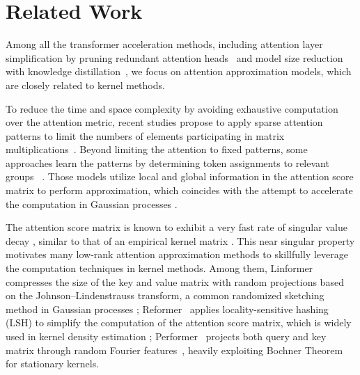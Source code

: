 \section{Related Work}
\label{sec:related_work}



Among all the transformer acceleration methods, including attention layer simplification by pruning redundant attention heads~\citep{DBLP:conf/acl/VoitaTMST19, DBLP:conf/nips/MichelLN19} and
model size reduction with knowledge distillation~\citep{DBLP:conf/emnlp/JiaoYSJCL0L20, DBLP:journals/corr/abs-1903-12136, DBLP:conf/acl/LiuZWZDJ20}, 
we focus on attention approximation models, which are closely related to kernel methods. 


To reduce the time and space complexity by avoiding exhaustive computation over the attention metric, recent studies propose to apply sparse attention patterns to limit the numbers of elements participating in matrix multiplications~\citep{DBLP:conf/emnlp/QiuMLYW020, DBLP:journals/corr/abs-1904-10509, DBLP:conf/nips/ZaheerGDAAOPRWY20, DBLP:journals/corr/abs-2004-05150}. 
Beyond limiting the attention to fixed patterns, some approaches learn the patterns by determining
token assignments to relevant groups ~\citep{DBLP:conf/iclr/KitaevKL20, DBLP:journals/tacl/RoySVG21}. 
Those models utilize local and global information in the attention score matrix to perform approximation,
which coincides with the attempt to accelerate the computation in Gaussian processes \citep{snelson2007local}.


The attention score matrix is known to exhibit a very fast rate of singular value decay \citep{bhojanapalli2020low, dong2021attention}, similar to that of an empirical kernel matrix \citep{yang2017randomized}.
This near singular property motivates many low-rank attention approximation methods to skillfully leverage the computation techniques in kernel methods.
Among them, Linformer~\citep{DBLP:journals/corr/abs-2006-04768} compresses the size of the key and value matrix with random projections based on the Johnson–Lindenstrauss transform, a common randomized sketching method in Gaussian processes \citep{yang2017randomized};
Reformer~\citep{DBLP:conf/iclr/KitaevKL20} applies locality-sensitive hashing (LSH) \citep{har2012approximate} to simplify the computation of the attention score matrix,
which is widely used in kernel density estimation \citep{charikar2017hashing, DBLP:conf/nips/BackursIW19};
Performer~\citep{DBLP:journals/corr/abs-2009-14794} projects both query and key matrix through random Fourier features~\citep{rahimi2007random},
heavily exploiting Bochner Theorem for stationary kernels. 

